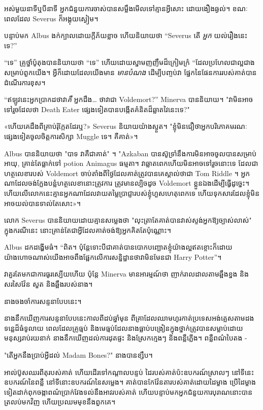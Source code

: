 អស់មួយនាទីឬបីនាទី អ្នកជំនួយការចាស់បានសម្លឹងមើលទៅគ្មានអ្វីសោះ ដោយងឿងឆ្ងល់។ ខណៈពេលដែល Severus ក៏អង្គុយស្ងៀម។

បន្ទាប់​មក Albus ងក់​ក្បាល​ដោយ​ក្តី​ភ័យ​ខ្លាច ហើយ​និយាយ​ថា “Severus តើ \emph{អ្នក} យល់​រឿង​នេះ​ទេ?”

“ទេ” គ្រូថ្នាំប៉ូតុងបាននិយាយថា “ទេ” ហើយដោយស្នាមញញឹមដ៏ក្រៀមក្រំ “ដែលប្រហែលជាល្អជាងសម្រាប់ពួកយើង។ អ្វីក៏ដោយដែលយើងមាន \emph{មានបំណង} ដើម្បីបញ្ចប់វា ផ្នែកនៃផែនការរបស់គាត់បានដំណើរការខុស។

“ឥឡូវ​នេះ​អ្នក​ប្រាកដ​ថា​វា​\emph{គឺ} អ្នក​ដឹង… ថា​វា​ជា Voldemort?” Minerva បាននិយាយ។ "វាមិនអាចទៅរួចដែលថា Death Eater ផ្សេងទៀតបានបង្កើតគំនិតដ៏ឆ្លាតវៃនេះទេ?"

«​ហើយ​គេ​ដឹង​ពី​គ្រាប់​រ៉ុក្កែត​ដែរ​ឬ?» Severus និយាយយ៉ាងស្ងួត។ "ខ្ញុំមិនជឿថាអ្នកបរិភោគមរណៈផ្សេងទៀតចូលចិត្តការសិក្សា Muggle ទេ។ គឺ​គាត់»។

Albus បាននិយាយថា "បាទ វាគឺជាគាត់" ។ "Azkaban បានស៊ូទ្រាំនឹងការមិនអាចចូលបានសម្រាប់អាយុ, គ្រាន់តែធ្លាក់ទៅ potion Animagus ធម្មតា។ វាឆ្លាតពេកហើយមិនអាចទៅរួចនោះទេ ដែលជាហត្ថលេខារបស់ Voldemort ចាប់តាំងពីថ្ងៃដែលគាត់ត្រូវបានគេស្គាល់ថាជា Tom Riddle ។ អ្នក​ណា​ដែល​ចង់​ក្លែង​បន្លំ​ហត្ថលេខា​នោះ​ត្រូវ​ការ %
ត្រូវមានល្បិចដូច Voldemort ខ្លួនឯងដើម្បីធ្វើដូច្នេះ។ ហើយ​លើ​លោក​នេះ​គ្មាន​អ្នក​ណា​ដែល​វាយ​តម្លៃ​ប្រាជ្ញា​របស់​ខ្ញុំ​ហួស​ហេតុ​ពេក​ទេ ហើយ​ទុក​សារ​ដែល​ខ្ញុំ​មិន​អាច​យល់​បាន​ទាល់​តែ​សោះ»។

លោក Severus បាននិយាយដោយគ្មានសម្លេងថា "លុះត្រាតែគាត់បានវាស់ស្ទង់អ្នកឱ្យច្បាស់លាស់" ក្នុងករណីនេះ នោះគ្រាន់តែជាអ្វីដែលគាត់ចង់ឱ្យអ្នកគិតតែប៉ុណ្ណោះ។

Albus ដកដង្ហើមធំ។ “ពិត។ ប៉ុន្តែទោះបីជាគាត់បានបោកបញ្ឆោតខ្ញុំយ៉ាងល្អឥតខ្ចោះក៏ដោយ យ៉ាងហោចណាស់យើងអាចពឹងផ្អែកលើការសន្និដ្ឋានថាវាមិនមែនជា Harry Potter”។

វាគួរតែមកជាការធូរស្បើយហើយ ប៉ុន្តែ Minerva មានអារម្មណ៍ថា ញាក់រាលដាលតាមឆ្អឹងខ្នង និងសរសៃវ៉ែន សួត និងឆ្អឹងរបស់នាង។

នាងចងចាំការសន្ទនាបែបនេះ។

នាងនឹកឃើញការសន្ទនាបែបនេះកាលពីដប់ឆ្នាំមុន ពីគ្រាដែលឈាមហូរកាត់ប្រទេសអង់គ្លេសតាមដងទន្លេដ៏ធំទូលាយ ពេលដែលគ្រូធ្មប់ និងមេធ្មប់ដែលនាងធ្លាប់បង្រៀនក្នុងថ្នាក់ត្រូវបានសម្លាប់ដោយមនុស្សរាប់រយនាក់ នាងនឹកឃើញដល់ការដុតផ្ទះ និងស្រែកក្មេងៗ និងពន្លឺភ្លើង។ ពន្លឺពណ៌បៃតង -

"តើអ្នកនឹងប្រាប់អ្វីដល់ Madam Bones?" នាងបានខ្សឹប។

អាល់ប៊ូសឈរពីតុរបស់គាត់ ហើយដើរទៅកណ្តាលបន្ទប់ ដៃរបស់គាត់ប៉ះឧបករណ៍ស្រាលៗ នៅទីនេះឧបករណ៍នៃពន្លឺ នៅទីនោះឧបករណ៍នៃសម្លេង។ គាត់បានកែវ៉ែនតារបស់គាត់ដោយដៃម្ខាង ប្រើដៃម្ខាងទៀតដាក់ពុកចង្កាពណ៌ប្រាក់វែងទល់នឹងអាវរបស់គាត់ ហើយបន្ទាប់មកអ្នកជំនួយការបុរាណនោះបានត្រលប់មកវិញ ហើយប្រឈមមុខនឹងពួកគេ។

